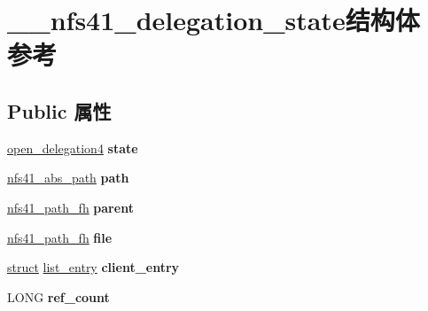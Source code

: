 \hypertarget{struct____nfs41__delegation__state}{}\section{\+\_\+\+\_\+nfs41\+\_\+delegation\+\_\+state结构体 参考}
\label{struct____nfs41__delegation__state}
\subsection*{Public 属性}
\begin{DoxyCompactItemize}
\item 
\mbox{\label{struct____nfs41__delegation__state_a8a8e6322165822d11659c847a45fb359}} 
\hyperlink{struct____open__delegation4}{open\+\_\+delegation4} {\bfseries state}
\item 
\mbox{\label{struct____nfs41__delegation__state_a172ff7f5769cca4a51a993eca99d24ef}} 
\hyperlink{struct____nfs41__abs__path}{nfs41\+\_\+abs\+\_\+path} {\bfseries path}
\item 
\mbox{\label{struct____nfs41__delegation__state_a946a811d4f8d64b5d12db962fe350c14}} 
\hyperlink{struct____nfs41__path__fh}{nfs41\+\_\+path\+\_\+fh} {\bfseries parent}
\item 
\mbox{\label{struct____nfs41__delegation__state_a2e1a9c0577c4bb557c91eaec185ffc36}} 
\hyperlink{struct____nfs41__path__fh}{nfs41\+\_\+path\+\_\+fh} {\bfseries file}
\item 
\mbox{\label{struct____nfs41__delegation__state_a032d0637523cf2e530c01b647d4b4b2a}} 
\hyperlink{interfacestruct}{struct} \hyperlink{structlist__entry}{list\+\_\+entry} {\bfseries client\+\_\+entry}
\item 
\mbox{\label{struct____nfs41__delegation__state_a53c39f27a884f8d71ef062827ca46a77}} 
L\+O\+NG {\bfseries ref\+\_\+count}
\item 
\mbox{\label{struct____nfs41__delegation__state_a0118185c6d4608e6cfb1359a1bc0e19e}} 

\end{DoxyCompactItemize}
